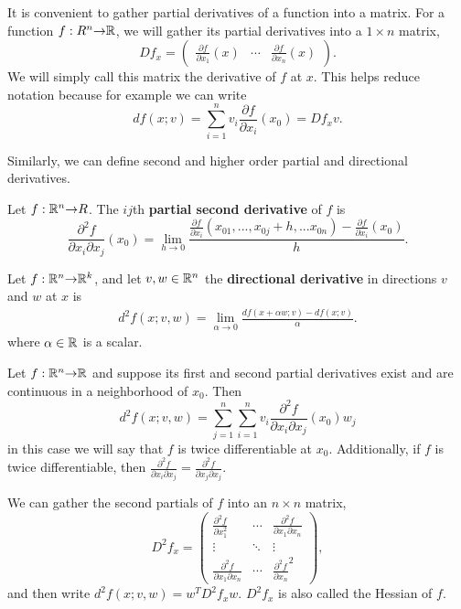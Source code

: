 It is convenient to gather partial derivatives of a function into a
matrix. For a function $f: R^n {\rightarrow} \mathbb{R}$, we will gather its partial
derivatives into a $1 \times n$ matrix, 
\[ Df_x = \begin{pmatrix} \frac{\partial f}{\partial x_1}(x) & \cdots
  & \frac{\partial f}{\partial x_n}(x)
\end{pmatrix}. \]
We will simply call this matrix the derivative of $f$ at $x$. This
helps reduce notation because for example we can write
\[ df(x;v) = \sum_{i=1}^n v_i \frac{\partial f}{\partial x_i}
(x_0) = Df_x v. \]

Similarly, we can define second and higher order partial and
directional derivatives.
\begin{definition}
  Let $f:\mathbb{R}^n {\rightarrow} R$. The $ij$th \textbf{partial second derivative} of $f$
  is 
  \[ \frac{\partial^2 f}{\partial x_i \partial x_j} (x_0) = \lim_{h \to 0}
  \frac{\frac{\partial f}{\partial x_i} (x_{01},...,x_{0j}+h, ... x_{0n}) -
    \frac{\partial f}{\partial x_i}(x_0) }{h}. \] 
\end{definition}
\begin{definition}
  Let $f: \mathbb{R}^n {\rightarrow} \mathbb{R}^k$, and let $v, w \in \mathbb{R}^n$ the \textbf{directional
    derivative} in directions $v$ and $w$ at $x$ is
  \begin{align*}
    d^2f(x;v,w) = \lim_{\alpha \to 0} \frac{df(x + \alpha w;v) - df(x;v)}{\alpha}.
  \end{align*}  
  where $\alpha \in \mathbb{R}$ is a scalar.
\end{definition}
\begin{theorem}\label{thm:pddiff2}
  Let $f:\mathbb{R}^n {\rightarrow} \mathbb{R}$ and suppose its first and second partial
  derivatives exist and are continuous in a neighborhood of
  $x_0$. Then
  \[ d^2f(x;v,w) = \sum_{j=1}^n \sum_{i=1}^n v_i \frac{\partial^2
    f}{\partial x_i \partial x_j}
  (x_0) w_j \]
  in this case we will say that $f$ is twice differentiable at $x_0$. 
  Additionally, if $f$ is twice differentiable, then $\frac{\partial^2
    f}{\partial x_i \partial x_j} = \frac{\partial^2
    f}{\partial x_j \partial x_j}$.
\end{theorem}
We can gather the second partials of $f$ into an $n \times n$ matrix,
\[ D^2 f_{x} = \begin{pmatrix} \frac{\partial ^2 f}{\partial x_1^2}
  & \cdots & \frac{\partial^2 f }{\partial x_1\partial x_n} \\
  \vdots & \ddots & \vdots \\
  \frac{\partial^2 f}{\partial x_1\partial x_n} & \cdots &
  \frac{\partial^2 f}{\partial x_n}^2 \end{pmatrix},
\]
and then write $d^2f(x;v,w) = w^T D^2 f_x w$. $D^2 f_x$ is also called
the Hessian of $f$.

\clearpage




